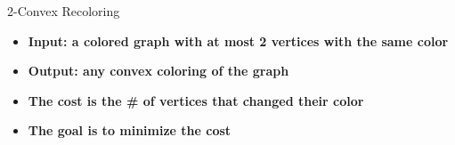 \begin{frame}{2-Convex Recoloring}
\begin{itemize}

\item \textbf<1>
{Input: a colored graph with at most 2 vertices with the same color}

\item \textbf<2>
{Output: any convex coloring of the graph}

\item \textbf<3>
{The cost is the \# of vertices that changed their color}

\item \textbf<4>
{The goal is to minimize the cost}

\end{itemize}



\end{frame}
